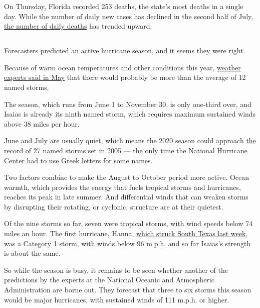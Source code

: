 On Thursday, Florida recorded 253 deaths, the state's most deaths in a
single day. While the number of daily new cases has declined in the
second half of July,
\href{https://www.nytimes.com/interactive/2020/us/florida-coronavirus-cases.html}{the
number of daily deaths} has trended upward.

\hypertarget{-4}{%
\subsection{}\label{-4}}

Forecasters predicted an active hurricane season, and it seems they were
right.

Because of warm ocean temperatures and other conditions this year,
\href{https://www.nytimes.com/2020/05/21/climate/hurricane-season-2020-noaa.html}{weather
experts said in May} that there would probably be more than the average
of 12 named storms.

The season, which runs from June 1 to November 30, is only one-third
over, and Isaias is already its ninth named storm, which requires
maximum sustained winds above 38 miles per hour.

June and July are usually quiet, which means the 2020 season could
approach
\href{https://slack-redir.net/link?url=https\%3A\%2F\%2Fwww.nhc.noaa.gov\%2Fdata\%2Ftcr\%2Findex.php\%3Fseason\%3D2005\%26basin\%3Datl}{the
record of 27 named storms set in 2005} --- the only time the National
Hurricane Center had to use Greek letters for some names.

Two factors combine to make the August to October period more active.
Ocean warmth, which provides the energy that fuels tropical storms and
hurricanes, reaches its peak in late summer. And differential winds that
can weaken storms by disrupting their rotating, or cyclonic, structure
are at their quietest.

Of the nine storms so far, seven were tropical storms, with wind speeds
below 74 miles an hour. The first hurricane, Hanna,
\href{https://www.nytimes.com/2020/07/26/us/virus-texas-storm.html}{which
struck South Texas last week}, was a Category 1 storm, with winds below
96 m.p.h. and so far Isaias's strength is about the same.

So while the season is busy, it remains to be seen whether another of
the predictions by the experts at the National Oceanic and Atmospheric
Administration are borne out. They forecast that three to six storms
this season would be major hurricanes, with sustained winds of 111
m.p.h. or higher.

